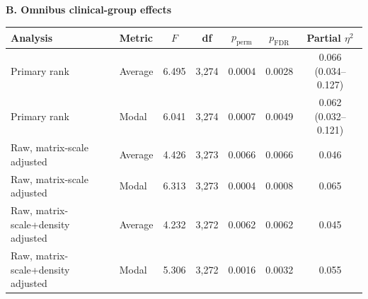 \documentclass{article}
\providecommand{\DIFaddtex}[1]{{\protect\color{blue}#1}} %
\providecommand{\DIFaddFL}[1]{\DIFadd{#1}} %
\providecommand{\DIFaddbeginFL}{} %
\providecommand{\DIFaddendFL}{} %
\providecommand{\DIFadd}[1]{\texorpdfstring{\DIFaddtex{#1}}{#1}} %
\begin{document}
\begin{table}[!htbp]
\DIFaddbeginFL \vspace{3mm}
\DIFaddFL{\textbf{B. Omnibus clinical-group effects}}\par\vspace{1mm}
\begin{tabular}{llccccc}
\toprule
\DIFaddFL{Analysis }& \DIFaddFL{Metric }& \DIFaddFL{$F$ }& \DIFaddFL{df }& \DIFaddFL{$p_{\mathrm{perm}}$ }& \DIFaddFL{$p_{\mathrm{FDR}}$ }& \DIFaddFL{Partial $\eta^2$}\\
\midrule
\DIFaddFL{Primary rank }& \DIFaddFL{Average }& \DIFaddFL{6.495 }& \DIFaddFL{3,274 }& \DIFaddFL{0.0004 }& \DIFaddFL{0.0028 }& \DIFaddFL{0.066 (0.034--0.127)}\\
\DIFaddFL{Primary rank }& \DIFaddFL{Modal }& \DIFaddFL{6.041 }& \DIFaddFL{3,274 }& \DIFaddFL{0.0007 }& \DIFaddFL{0.0049 }& \DIFaddFL{0.062 (0.032--0.121)}\\
\DIFaddFL{Raw, matrix-scale adjusted }& \DIFaddFL{Average }& \DIFaddFL{4.426 }& \DIFaddFL{3,273 }& \DIFaddFL{0.0066 }& \DIFaddFL{0.0066 }& \DIFaddFL{0.046}\\
\DIFaddFL{Raw, matrix-scale adjusted }& \DIFaddFL{Modal }& \DIFaddFL{6.313 }& \DIFaddFL{3,273 }& \DIFaddFL{0.0004 }& \DIFaddFL{0.0008 }& \DIFaddFL{0.065}\\
\DIFaddFL{Raw, matrix-scale+density adjusted }& \DIFaddFL{Average }& \DIFaddFL{4.232 }& \DIFaddFL{3,272 }& \DIFaddFL{0.0062 }& \DIFaddFL{0.0062 }& \DIFaddFL{0.045}\\
\DIFaddFL{Raw, matrix-scale+density adjusted }& \DIFaddFL{Modal }& \DIFaddFL{5.306 }& \DIFaddFL{3,272 }& \DIFaddFL{0.0016 }& \DIFaddFL{0.0032 }& \DIFaddFL{0.055}\\
\DIFaddendFL \bottomrule
\end{tabular}


\end{table}
\end{document}
